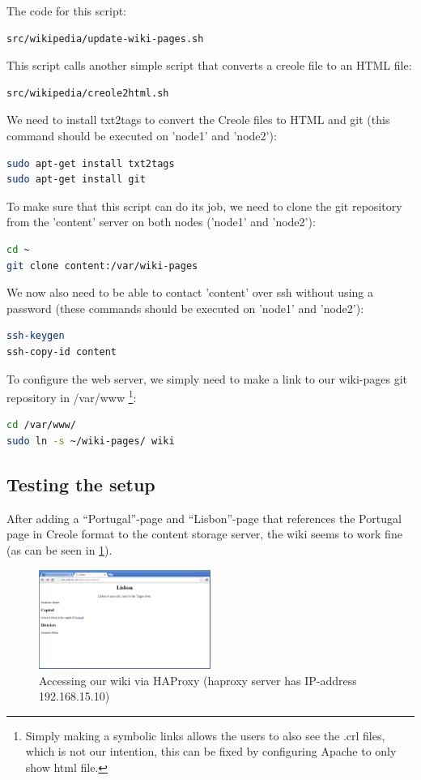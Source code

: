 \documentclass[12pt]{report}
\begin{document}
The code for this script:
 \begin{lstlisting}[language=bash]
src/wikipedia/update-wiki-pages.sh
\end{lstlisting}
This script calls another simple script that converts a creole file to
an HTML file:
 \begin{lstlisting}[language=bash]
src/wikipedia/creole2html.sh
\end{lstlisting}

We need to install txt2tags to convert the Creole files to HTML and git (this
command should be executed on 'node1' and 'node2'):
\begin{lstlisting}[language=bash]
sudo apt-get install txt2tags
sudo apt-get install git
\end{lstlisting}

To make sure that this script can do its job, we need to clone the git
repository from the 'content' server on both nodes ('node1' and 'node2'):
 \begin{lstlisting}[language=bash]
cd ~
git clone content:/var/wiki-pages
\end{lstlisting}
We now also need to be able to contact 'content' over ssh without using
a password (these commands should be executed on 'node1' and 'node2'):
\begin{lstlisting}[language=bash]
ssh-keygen
ssh-copy-id content
\end{lstlisting}

To configure the web server, we simply need to make a link to our
wiki-pages git repository in /var/www \footnote{Simply making a
  symbolic links allows the users to also see the .crl files, which is
  not our intention, this can be fixed by configuring Apache to only
  show html file.}:
\begin{lstlisting}[language=bash]
cd /var/www/
sudo ln -s ~/wiki-pages/ wiki
\end{lstlisting}

\subsection{Testing the setup}
After adding a ``Portugal''-page and ``Lisbon''-page that references
the Portugal page in Creole format to the content storage server, the
wiki seems to work fine (as can be seen in \ref{fig:wikipedia_clone_1}).

\begin{figure}[h!]
  \caption{Accessing our wiki via HAProxy (haproxy server has
    IP-address 192.168.15.10)}
  \label{fig:wikipedia_clone_1}
  \centering
    \includegraphics[width=0.5\textwidth]{pics/wikipedia_clone_1.png}
\end{figure}
\end{document}
